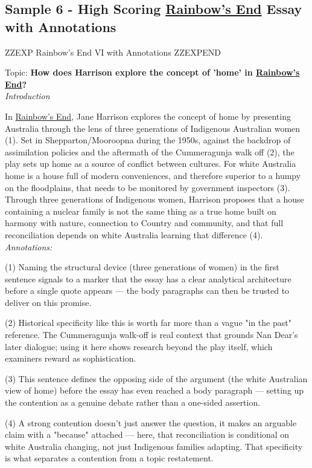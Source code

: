 \documentclass[a4paper]{article}
\begin{document}
\subsection{Sample 6 - High Scoring \underline{Rainbow's End} Essay with Annotations}


ZZEXP Rainbow's End VI with Annotations ZZEXPEND



Topic:
\textbf{How does Harrison explore the concept of 'home' in \underline{Rainbow's End}?}\\

\textit{Introduction}

In \underline{Rainbow's End}, Jane Harrison explores the concept of home by presenting Australia through the lens of three generations of Indigenous Australian women (1). Set in Shepparton/Mooroopna during the 1950s, against the backdrop of assimilation policies and the aftermath of the Cummeragunja walk off (2), the play sets up home as a source of conflict between cultures. For white Australia home is a house full of modern conveniences, and therefore superior to a humpy on the floodplains, that needs to be monitored by government inspectors (3). Through three generations of Indigenous women, Harrison proposes that a house containing a nuclear family is not the same thing as a true home built on harmony with nature, connection to Country and community, and that full reconciliation depends on white Australia learning that difference (4).\\

\textit{Annotations:}

(1) Naming the structural device (three generations of women) in the first sentence signals to a marker that the essay has a clear analytical architecture before a single quote appears — the body paragraphs can then be trusted to deliver on this promise.

(2) Historical specificity like this is worth far more than a vague "in the past" reference. The Cummeragunja walk-off is real context that grounds Nan Dear's later dialogue; using it here shows research beyond the play itself, which examiners reward as sophistication.

(3) This sentence defines the opposing side of the argument (the white Australian view of home) before the essay has even reached a body paragraph — setting up the contention as a genuine debate rather than a one-sided assertion.

(4) A strong contention doesn't just answer the question, it makes an arguable claim with a "because" attached — here, that reconciliation is conditional on white Australia changing, not just Indigenous families adapting. That specificity is what separates a contention from a topic restatement.\\
\end{document}

